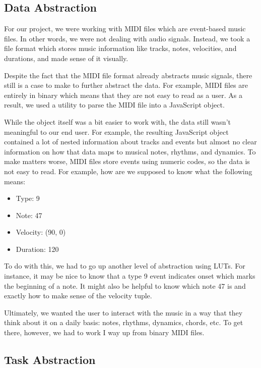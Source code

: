 \documentclass[journal]{vgtc}                %
\begin{document}
\subsection{Data Abstraction}

For our project, we were working with MIDI files which are event-based music
files. In other words, we were not dealing with audio signals. Instead, we took
a file format which stores music information like tracks, notes, velocities, and
durations, and made sense of it visually.

Despite the fact that the MIDI file format already abstracts music signals,
there still is a case to make to further abstract the data. For example,
MIDI files are entirely in binary which means that they are not easy to read
as a user. As a result, we used a utility to parse the MIDI file into a
JavaScript object.

While the object itself was a bit easier to work with, the data still wasn't
meaningful to our end user. For example, the resulting JavaScript object
contained a lot of nested information about tracks and events but almost no
clear information on how that data maps to musical notes, rhythms, and dynamics.
To make matters worse, MIDI files store events using numeric codes, so the
data is not easy to read. For example, how are we supposed to know what
the following means:

\begin{itemize}
  \item Type: 9
  \item Note: 47
  \item Velocity: (90, 0)
  \item Duration: 120
\end{itemize}

To do with this, we had to go up another level of abstraction using LUTs.
For instance, it may be nice to know that a type 9 event indicates onset which
marks the beginning of a note. It might also be helpful to know which note 47
is and exactly how to make sense of the velocity tuple.

Ultimately, we wanted the user to interact with the music in a way that they
think about it on a daily basis: notes, rhythms, dynamics, chords, etc. To get
there, however, we had to work I way up from binary MIDI files.

\subsection{Task Abstraction}
\end{document}
